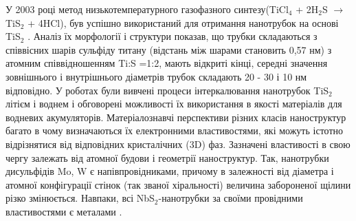 У 2003 році метод низькотемпературного газофазного синтезу(TiCl$_4$ + 2H$_2$S $\rightarrow$ TiS$_2$ + 4HCl), був успішно використаний для отримання нанотрубок на основі TiS$_2$ \cite{nanotube}. Аналіз їх морфології і структури показав, що трубки складаються з співвісних шарів сульфіду титану (відстань між шарами становить 0,57 нм) з атомним співвідношенням Ti:S =1:2, мають відкриті кінці, середні значення зовнішнього і внутрішнього діаметрів трубок складають  20 - 30 і  10 нм відповідно. У роботах \cite{nanotube2,nanotube3} були вивчені процеси інтеркалювання нанотрубок TiS$_2$ літієм і воднем і обговорені можливості їх використання в якості матеріалів для водневих акумуляторів. Матеріалознавчі перспективи різних класів наноструктур багато в чому визначаються їх електронними властивостями, які можуть істотно відрізнятися від відповідних кристалічних (3D) фаз. Зазначені властивості в свою чергу залежать від атомної будови і геометрії наноструктур. Так, нанотрубки дисульфідів Mo, W є напівпровідниками, причому в залежності від діаметра і атомної конфігурації стінок (так званої хіральності) величина забороненої щілини різко змінюється. Навпаки, всі NbS$_2$-нанотрубки за своїми провідними властивостями є металами \cite{nanotube4,nanotube5,nanotube6}. ~\cite{doi:10.1126/science.1102896}